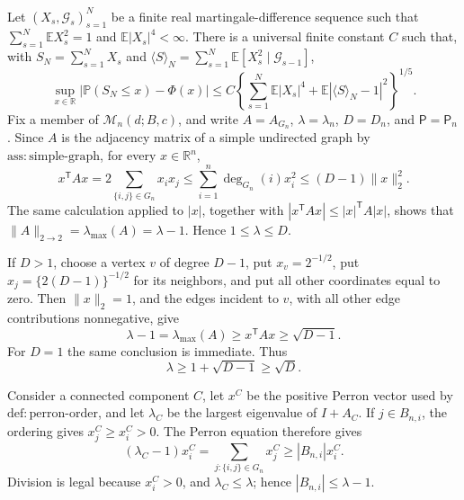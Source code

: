 Let \((X_s,\mathcal G_s)_{s=1}^N\) be a finite real martingale-difference sequence such that \(\sum_{s=1}^N\mathbb E X_s^2=1\) and \(\mathbb E|X_s|^4<\infty\).  There is a universal finite constant \(C\) such that, with \(S_N=\sum_{s=1}^N X_s\) and \(\langle S\rangle_N=\sum_{s=1}^N\mathbb E[X_s^2\mid\mathcal G_{s-1}]\),
\[
 \sup_{x\in\mathbb R}\left|\mathbb P(S_N\le x)-\Phi(x)\right|
 \le C\left\{\sum_{s=1}^N\mathbb E|X_s|^4+
 \mathbb E|\langle S\rangle_N-1|^2\right\}^{1/5}.
\]
Fix a member of \(\mathcal M_n(d;B,c)\), and write \(A=A_{G_n}\), \(\lambda=\lambda_n\), \(D=D_n\), and \(\mathsf P=\mathsf P_n\).  Since \(A\) is the adjacency matrix of a simple undirected graph by \(\mathrm{ass:simple\text{-}graph}\), for every \(x\in\mathbb R^n\),
\[
 x^{\mathsf T}Ax=2\sum_{\{i,j\}\in G_n}x_ix_j
 \le \sum_{i=1}^n\deg_{G_n}(i)x_i^2\le(D-1)\|x\|_2^2.
\]
The same calculation applied to \(|x|\), together with \(|x^{\mathsf T}Ax|\le |x|^{\mathsf T}A|x|\), shows that \(\|A\|_{2\to2}=\lambda_{\max}(A)=\lambda-1\).  Hence \(1\le\lambda\le D\).

If \(D>1\), choose a vertex \(v\) of degree \(D-1\), put \(x_v=2^{-1/2}\), put \(x_j=\{2(D-1)\}^{-1/2}\) for its neighbors, and put all other coordinates equal to zero.  Then \(\|x\|_2=1\), and the edges incident to \(v\), with all other edge contributions nonnegative, give
\[
 \lambda-1=\lambda_{\max}(A)\ge x^{\mathsf T}Ax\ge\sqrt{D-1}.
\]
For \(D=1\) the same conclusion is immediate.  Thus
\[
 \lambda\ge1+\sqrt{D-1}\ge\sqrt D.
\]

Consider a connected component \(C\), let \(x^C\) be the positive Perron vector used by \(\mathrm{def:perron\text{-}order}\), and let \(\lambda_C\) be the largest eigenvalue of \(I+A_C\).  If \(j\in B_{n,i}\), the ordering gives \(x^C_j\ge x^C_i>0\).  The Perron equation therefore gives
\[
 (\lambda_C-1)x^C_i=\sum_{j:\{i,j\}\in G_n}x^C_j
 \ge |B_{n,i}|x^C_i.
\]
Division is legal because \(x^C_i>0\), and \(\lambda_C\le\lambda\); hence \(|B_{n,i}|\le\lambda-1\).

